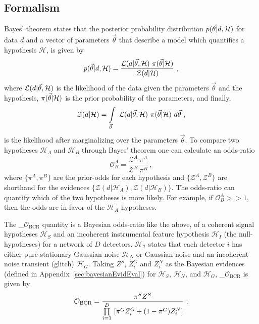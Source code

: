\documentclass[%
 nofootinbib,
 amsmath,amssymb,
 aps,
 twocolumn,
 superscriptaddress
]{revtex4-2}
\newcommand{\mathcmd}[1]{{\sc \relax\ifmmode#1\else $#1$\fi}\xspace}
\newcommand{\bcrodds}{\mathcmd{\mathcal{O}_{\mathrm{BCR}}}}
\newcommand{\parameters}{\mathcmd{\vec{\theta}}}
\begin{document}
\subsection{Formalism}

Bayes' theorem states that the posterior probability distribution $p(\parameters|d,\mathcal{H})$ for data $d$ and a vector of parameters \parameters that describe a model which quantifies a hypothesis $\mathcal{H}$, is given by
\begin{equation}
p(\parameters|d,\mathcal{H}) = \frac{\mathcal{L}(d|\parameters, \mathcal{H}) \ \pi(\parameters | \mathcal{H})}{\mathcal{Z}(d|\mathcal{H})}\ , 
\end{equation}
where $\mathcal{L}(d|\parameters, \mathcal{H})$ is the likelihood of the data given the parameters \parameters and the hypothesis, $\pi(\parameters | \mathcal{H})$ is the prior probability of the parameters, and finally,
\begin{equation}
    \mathcal{Z}(d|\mathcal{H}) = \int\limits_{\parameters} \ \mathcal{L}(d|\parameters,\mathcal{H}) \ \pi(\parameters | \mathcal{H}) \ d\parameters\ ,
\end{equation} is the likelihood after marginalizing over the parameters \parameters.  To compare two hypotheses $\mathcal{H}_A$ and $\mathcal{H}_B$ through Bayes' theorem one can calculate an odds-ratio
\begin{equation}
    \mathcal{O}^A_B = \frac{\mathcal{Z}^A\ \pi^A}{\mathcal{Z}^B\ \pi^B}\ ,
\end{equation}
where  $\{\pi^A, \pi^B\}$ are the prior-odds for each hypothesis and $\{\mathcal{Z}^A, \mathcal{Z}^B\}$ are shorthand for the evidences $\{\mathcal{Z}(d|\mathcal{H}_A), \mathcal{Z}(d|\mathcal{H}_B)\}$. The odds-ratio can quantify which of the two hypotheses is more likely. For example, if $\mathcal{O}^A_B >> 1$, then the odds are in favor of the $\mathcal{H}_A$ hypotheses. 

The \bcrodds quantity is a Bayesian odds-ratio like the above, of a coherent signal hypotheses $\mathcal{H}_S$ and an incoherent instrumental feature hypothesis $\mathcal{H}_I$ (the null-hypotheses) for a network of $D$ detectors. $\mathcal{H_I}$ states that each detector $i$ has either pure stationary Gaussian noise $\mathcal{H}_N$ or Gaussian noise and an incoherent noise transient (glitch) $\mathcal{H}_G$. Taking $Z^S$, $Z^G_i$ and $Z^N_i$ as the Bayesian evidences (defined in Appendix~\ref{sec:bayesianEvidEval}) for $\mathcal{H}_S$, $\mathcal{H}_N$, and $\mathcal{H}_G$, \bcrodds is given by
\begin{equation}
\label{eq:bcr}
\bcrodds = \frac{\pi^S Z^S}{\prod\limits^D_{i=1} \ [\pi^G Z^G_i + (1-\pi^G)Z^N_i]}\ ,
\end{equation}
\end{document}
